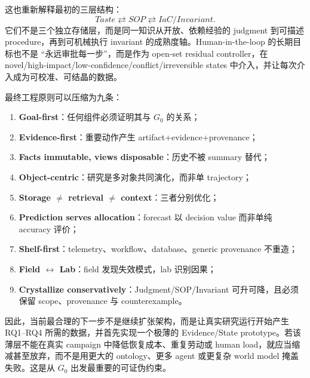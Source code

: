 \documentclass[11pt,a4paper]{ctexart}
\begin{document}
这也重新解释最初的三层结构：
\begin{equation}
\boxed{Taste\rightleftarrows SOP\rightleftarrows IaC/Invariant.}
\end{equation}
它们不是三个独立存储层，而是同一知识从开放、依赖经验的 judgment 到可描述 procedure，再到可机械执行 invariant 的成熟度轴。Human-in-the-loop 的长期目标也不是 ``永远审批每一步''，而是作为 open-set residual controller，在 novel/high-impact/low-confidence/conflict/irreversible states 中介入，并让每次介入成为可校准、可结晶的数据。

最终工程原则可以压缩为九条：
\begin{enumerate}
\item \textbf{Goal-first}：任何组件必须证明其与 $G_0$ 的关系；
\item \textbf{Evidence-first}：重要动作产生 artifact+evidence+provenance；
\item \textbf{Facts immutable, views disposable}：历史不被 summary 替代；
\item \textbf{Object-centric}：研究是多对象共同演化，而非单 trajectory；
\item \textbf{Storage $\neq$ retrieval $\neq$ context}：三者分别优化；
\item \textbf{Prediction serves allocation}：forecast 以 decision value 而非单纯 accuracy 评价；
\item \textbf{Shelf-first}：telemetry、workflow、database、generic provenance 不重造；
\item \textbf{Field $\leftrightarrow$ Lab}：field 发现失效模式，lab 识别因果；
\item \textbf{Crystallize conservatively}：Judgment/SOP/Invariant 可升可降，且必须保留 scope、provenance 与 counterexample。
\end{enumerate}

因此，当前最合理的下一步不是继续扩张架构，而是让真实研究运行开始产生 RQ1--RQ4 所需的数据，并首先实现一个极薄的 Evidence/State prototype。若该薄层不能在真实 campaign 中降低恢复成本、重复劳动或 human load，就应当缩减甚至放弃，而不是用更大的 ontology、更多 agent 或更复杂 world model 掩盖失败。这是从 $G_0$ 出发最重要的可证伪约束。

\printbibliography
\end{document}
